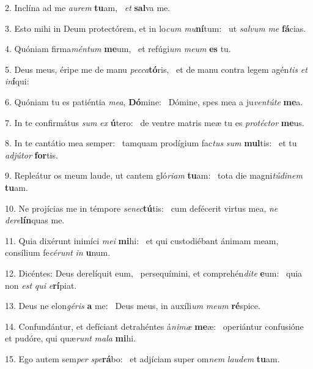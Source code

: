 2. Inclína ad me \textit{au}\textit{rem} \textbf{tu}am, \ast\  \textit{et} \textbf{sal}va me.\

3. Esto mihi in Deum protectórem, et in lo\textit{cum} \textit{mu}\textbf{ní}tum: \ast\  ut \textit{sal}\textit{vum} \textit{me} \textbf{fá}cias.\

4. Quóniam firma\textit{mén}\textit{tum} \textbf{me}um, \ast\  et refúgi\textit{um} \textit{me}\textit{um} \textbf{es} tu.\

5. Deus meus, éripe me de manu \textit{pec}\textit{ca}\textbf{tó}ris, \ast\  et de manu contra legem agén\textit{tis} \textit{et} \textit{in}\textbf{í}qui:\

6. Quóniam tu es patiéntia \textit{me}\textit{a}, \textbf{Dó}mine: \ast\  Dómine, spes mea a ju\textit{ven}\textit{tú}\textit{te} \textbf{me}a.\

7. In te confirmátus \textit{sum} \textit{ex} \textbf{ú}tero: \ast\  de ventre matris meæ tu es \textit{pro}\textit{téc}\textit{tor} \textbf{me}us.\

8. In te cantátio mea semper: \dag\  tamquam prodígium fac\textit{tus} \textit{sum} \textbf{mul}tis: \ast\  et tu \textit{ad}\textit{jú}\textit{tor} \textbf{for}tis.\

9. Repleátur os meum laude, ut cantem gló\textit{ri}\textit{am} \textbf{tu}am: \ast\  tota die magni\textit{tú}\textit{di}\textit{nem} \textbf{tu}am.\

10. Ne projícias me in témpore \textit{se}\textit{nec}\textbf{tú}tis: \ast\  cum defécerit virtus mea, \textit{ne} \textit{de}\textit{re}\textbf{lín}quas me.\

11. Quia dixérunt inimíci \textit{me}\textit{i} \textbf{mi}hi: \ast\  et qui custodiébant ánimam meam, consílium fe\textit{cé}\textit{runt} \textit{in} \textbf{u}num.\

12. Dicéntes: Deus derelíquit eum, \dag\  persequímini, et comprehén\textit{di}\textit{te} \textbf{e}um: \ast\  quia non \textit{est} \textit{qui} \textit{e}\textbf{rí}piat.\

13. Deus ne elon\textit{gé}\textit{ris} \textbf{a} me: \ast\  Deus meus, in auxíli\textit{um} \textit{me}\textit{um} \textbf{ré}spice.\

14. Confundántur, et defíciant detrahéntes á\textit{ni}\textit{mæ} \textbf{me}æ: \ast\  operiántur confusióne et pudóre, qui quæ\textit{runt} \textit{ma}\textit{la} \textbf{mi}hi.\

15. Ego autem sem\textit{per} \textit{spe}\textbf{rá}bo: \ast\  et adjíciam super om\textit{nem} \textit{lau}\textit{dem} \textbf{tu}am.\

